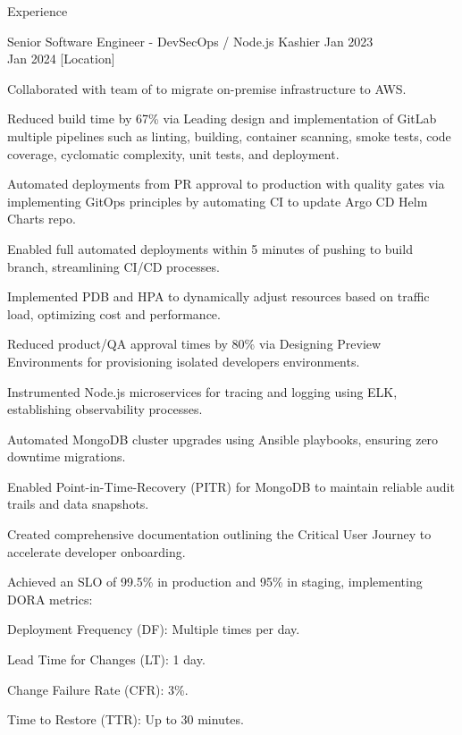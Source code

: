 \begin{rSection}{Experience}
    \begin{rSubsection}
        {Senior Software Engineer - DevSecOps / Node.js}
        {Kashier}
        {Jan 2023 \\ Jan 2024}
        [Location] %
        \begin{rItemize}
            \item Collaborated with team of %
            to migrate on-premise infrastructure to AWS.
            \item Reduced build time by 67\% via Leading design and implementation of GitLab multiple pipelines such as linting, building, container scanning, smoke tests, code coverage, cyclomatic complexity, unit tests, and deployment.
            \item Automated deployments from PR approval to production with quality gates via implementing GitOps principles by automating CI to update Argo CD Helm Charts repo.
            \item Enabled full automated deployments within 5 minutes of pushing to build branch, streamlining CI/CD processes.
            \item Implemented PDB and HPA to dynamically adjust resources based on traffic load, optimizing cost and performance.
            \item Reduced product/QA approval times by 80\% via Designing Preview Environments for provisioning isolated developers environments.
            \item Instrumented Node.js microservices for tracing and logging using ELK, establishing observability processes.
            \item Automated MongoDB cluster upgrades using Ansible playbooks, ensuring zero downtime migrations.
            \item Enabled Point-in-Time-Recovery (PITR) for MongoDB to maintain reliable audit trails and data snapshots.
            \item Created comprehensive documentation outlining the Critical User Journey to accelerate developer onboarding.
            \item Achieved an SLO of 99.5\% in production and 95\% in staging, implementing DORA metrics:
            \begin{rItemize}
                \item Deployment Frequency (DF): Multiple times per day.
                \item Lead Time for Changes (LT): 1 day.
                \item Change Failure Rate (CFR): 3\%.
                \item Time to Restore (TTR): Up to 30 minutes.
            \end{rItemize}
        \end{rItemize}
    \end{rSubsection}


\end{rSection}
